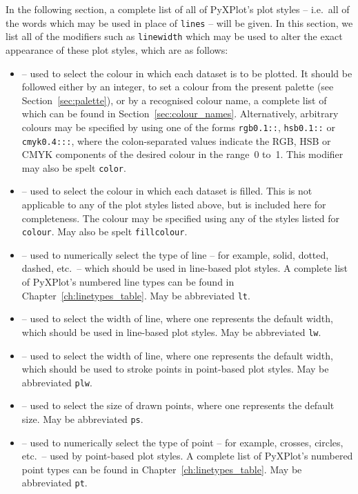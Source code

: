 In the following section, a complete list of all of PyXPlot's plot styles --
i.e.\ all of the words which may be used in place of {\tt lines} -- will be
given. In this section, we list all of the modifiers such as {\tt line\-width}
which may be used to alter the exact appearance of these plot styles, which are
as follows:
\begin{itemize}
\item {} -- used to select the colour in which each dataset is to be plotted. It should be followed either by an integer, to set a colour from the present palette (see Section~\ref{sec:palette}), or by a recognised colour name, a complete list of which can be found in Section~\ref{sec:colour_names}. Alternatively, arbitrary colours may be specified by using one of the forms {\tt rgb0.1::}, {\tt hsb0.1::} or {\tt cmyk0.4:::}, where the colon-separated values indicate the RGB, HSB or CMYK components of the desired colour in the range~0 to~1. This modifier may also be spelt {\tt color}.
\item {} -- used to select the colour in which each dataset is filled. This is not applicable to any of the plot styles listed above, but is included here for completeness. The colour may be specified using any of the styles listed for {\tt colour}. May also be spelt {\tt fillcolour}.
\item {} -- used to numerically select the type of line -- for example, solid, dotted, dashed, etc.\ -- which should be used in line-based plot styles. A complete list of PyXPlot's numbered line types can be found in Chapter~\ref{ch:linetypes_table}. May be abbreviated {\tt lt}.
\item {} -- used to select the width of line, where one represents the default width, which should be used in line-based plot styles. May be abbreviated {\tt lw}.
\item {} -- used to select the width of line, where one represents the default width, which should be used to stroke points in point-based plot styles. May be abbreviated {\tt plw}.
\item {} -- used to select the size of drawn points, where one represents the default size. May be abbreviated {\tt ps}.
\item {} -- used to numerically select the type of point -- for example, crosses, circles, etc.\ -- used by point-based plot styles. A complete list of PyXPlot's numbered point types can be found in Chapter~\ref{ch:linetypes_table}. May be abbreviated {\tt pt}.
\end{itemize}

